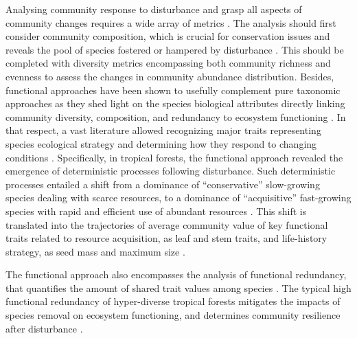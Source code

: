 \documentclass[fleqn,10pt]{ArtEcoFoG} %
\begin{document}
Analysing community response to disturbance and grasp all aspects of community changes requires a wide array of metrics \citep{Sheil2003, Shea2004, Mayfield2010}.
The analysis should first consider community composition, which is crucial for conservation issues and reveals the pool of species fostered or hampered by disturbance \citep{Lavorel2002, Bellwood2006}.
This should be completed with diversity metrics encompassing both community richness and evenness to assess the changes in community abundance distribution.
Besides, functional approaches have been shown to usefully complement pure taxonomic approaches as they shed light on the species biological attributes directly linking community diversity, composition, and redundancy to ecosystem functioning \citep{Violle2007b, Baraloto2012a}.
In that respect, a vast literature allowed recognizing major traits representing species ecological strategy and determining how they respond to changing conditions \citep{Diaz2005}.
Specifically, in tropical forests, the functional approach revealed the emergence of deterministic processes following disturbance.
Such deterministic processes entailed a shift from a dominance of ``conservative'' slow-growing species dealing with scarce resources, to a dominance of ``acquisitive'' fast-growing species with rapid and efficient use of abundant resources \citep{Rees2001, Reich2014, Herault2011}.
This shift is translated into the trajectories of average community value of key functional traits related to resource acquisition, as leaf and stem traits, and life-history strategy, as seed mass and maximum size \citep{Wright2004, TerSteege2006, Westoby2006a, Chave2009b}.

The functional approach also encompasses the analysis of functional redundancy, that quantifies the amount of shared trait values among species \citep{Carmona2016}.
The typical high functional redundancy of hyper-diverse tropical forests \citep{Bellwood2006} mitigates the impacts of species removal on ecosystem functioning, and determines community resilience after disturbance \citep{Elmqvist2003, Diaz2005}.
\end{document}
